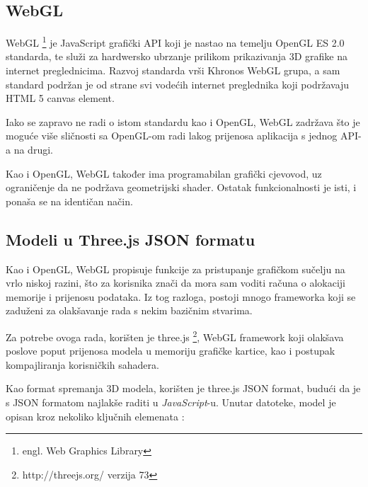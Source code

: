 \subsection{WebGL}

WebGL \footnote{engl. Web Graphics Library} je JavaScript grafički API koji je nastao na temelju OpenGL ES 2.0 standarda, te služi za hardwersko ubrzanje prilikom prikazivanja 3D grafike na internet preglednicima. Razvoj standarda vrši Khronos WebGL grupa, a sam standard podržan je od strane svi vodećih internet preglednika koji podržavaju HTML 5 canvas element.

Iako se zapravo ne radi o istom standardu kao i OpenGL, WebGL zadržava što je moguće više sličnosti sa OpenGL-om radi lakog prijenosa aplikacija s jednog API-a na drugi.

Kao i OpenGL, WebGL također ima programabilan grafički cjevovod, uz ograničenje da ne podržava geometrijski shader. Ostatak funkcionalnosti je isti, i ponaša se na identičan način.

\subsection{Modeli u Three.js JSON formatu}

Kao i OpenGL, WebGL propisuje funkcije za pristupanje grafičkom sučelju na vrlo niskoj razini, što za korisnika znači da mora sam voditi računa o alokaciji memorije i prijenosu podataka. Iz tog razloga, postoji mnogo frameworka koji se zaduženi za olakšavanje rada s nekim bazičnim stvarima.

Za potrebe ovoga rada, korišten je three.js \footnote{http://threejs.org/ verzija 73}, WebGL framework koji olakšava poslove poput prijenosa modela u memoriju grafičke kartice, kao i postupak kompajliranja korisničkih sahadera.

Kao format spremanja 3D modela, korišten je three.js JSON format, budući da je s JSON formatom najlakše raditi u \emph{JavaScript}-u. Unutar datoteke, model je opisan kroz nekoliko ključnih elemenata \cite{threejs-json}:


